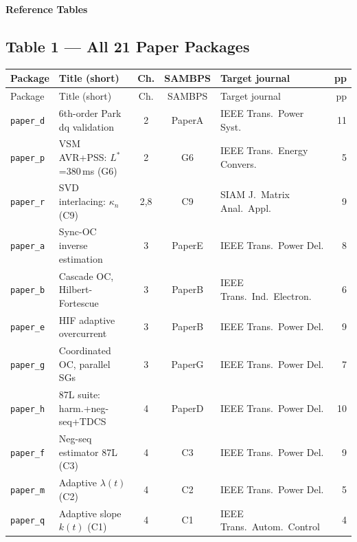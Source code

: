 \documentclass[11pt,a4paper]{article}
\begin{document}
\clearpage
\begin{center}
{\large\bfseries Reference Tables}
\end{center}

\subsection*{Table 1 — All 21 Paper Packages}

{\small
\begin{longtable}{llccp{3.0cm}r}
\toprule
Package & Title (short) & Ch. & SAMBPS & Target journal & pp \\
\midrule
\endfirsthead
\toprule Package & Title (short) & Ch. & SAMBPS & Target journal & pp \\
\midrule\endhead \bottomrule\endfoot
\rowcolor{ch2col!8}
\texttt{paper\_d} & 6th-order Park dq validation & 2 & PaperA & IEEE Trans.\ Power Syst. & 11 \\
\rowcolor{ch2col!8}
\texttt{paper\_p} & VSM AVR+PSS: $L^*$=380\,ms (G6) & 2 & G6 & IEEE Trans.\ Energy Convers. & 5 \\
\rowcolor{ch2col!8}
\texttt{paper\_r} & SVD interlacing: $\kappa_n$ (C9) & 2,8 & C9 & SIAM J.\ Matrix Anal.\ Appl. & 9 \\
\rowcolor{ch3col!8}
\texttt{paper\_a} & Sync-OC inverse estimation & 3 & PaperE & IEEE Trans.\ Power Del. & 8 \\
\rowcolor{ch3col!8}
\texttt{paper\_b} & Cascade OC, Hilbert-Fortescue & 3 & PaperB & IEEE Trans.\ Ind.\ Electron. & 6 \\
\rowcolor{ch3col!8}
\texttt{paper\_e} & HIF adaptive overcurrent & 3 & PaperB & IEEE Trans.\ Power Del. & 9 \\
\rowcolor{ch3col!8}
\texttt{paper\_g} & Coordinated OC, parallel SGs & 3 & PaperG & IEEE Trans.\ Power Del. & 7 \\
\rowcolor{ch4col!8}
\texttt{paper\_h} & 87L suite: harm.+neg-seq+TDCS & 4 & PaperD & IEEE Trans.\ Power Del. & 10 \\
\rowcolor{ch4col!8}
\texttt{paper\_f} & Neg-seq estimator 87L (C3) & 4 & C3 & IEEE Trans.\ Power Del. & 9 \\
\rowcolor{ch4col!8}
\texttt{paper\_m} & Adaptive $\lambda(t)$ (C2) & 4 & C2 & IEEE Trans.\ Power Del. & 5 \\
\rowcolor{ch4col!8}
\texttt{paper\_q} & Adaptive slope $k(t)$ (C1) & 4 & C1 & IEEE Trans.\ Autom.\ Control & 4 \\

\end{longtable}}
\end{document}
